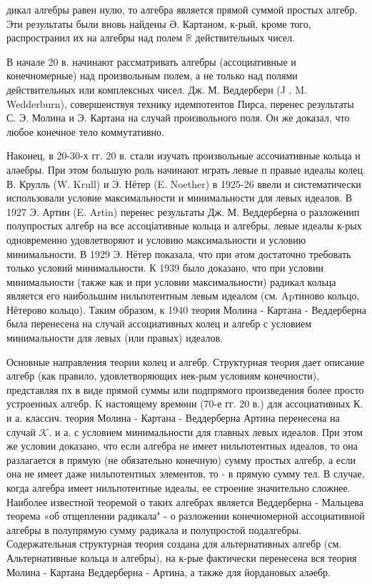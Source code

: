 \documentclass[10pt]{article}
\begin{document}
дикал алгебры равен нулю, то алгебра является прямой суммой простых алгебр. Эти результаты были вновь найдены Ә. Картаном, к-рый, кроме того, распространил их на алгебры над полем $\mathbb{R}$ действительных чисел.



В начале 20 в. начинают рассматривать алгебры (ассоциативные и конечномерные) над произвольным полем, а не только над полями действительных или комплексных чисел. Дж. М. Веддерберн (J . M. Wedderburn), совершенствуя технику идемпотентов Пирса, перенес результаты С. Э. Молина и Э. Картана на случай произвольного поля. Он же доказал, что любое конечное тело коммутативно.



Наконец, в 20-30-х гг. 20 в. стали изучать произвольные ассочиативные кольца $и$ аләебры. При этом большую роль начинают играть левые п правые идеалы колец. В. Крулль (W. Krull) и Э. Нётер (E. Noether) в 1925-26 ввели и систематически использовали условие максимальности и минимальности для левых идеалов. В 1927 Э. Артин (E. Artin) перенес результаты Дж. М. Веддерберна о разложенип полупростых алгебр на все ассоціативные кольца и алгебры, левые идеалы к-рых одновременно удовлетворяют и условию максимальности и условию минимальности. В 1929 Э. Нётер показала, что при әтом достаточно требовать только условий минимальности. К 1939 было доказано, что при условии минимальности (также как и при условии максимальности) радикал кольца является его наибольшим нильпотентным левым идеалом (см. Apтиново кольцо, Нётерово кольцо). Таким образом, к 1940 теория Молина - Картана - Веддерберна была перенесена на случай ассоциативных колец и алгебр с условием минимальности для левых (или правых) идеалов.



Основные направления теории колец и алгебр. Структурная теория дает описание алгебр (как правило, удовлетворяющих нек-рым условиям конечности), представляя пх в виде прямой суммы или подпрямого произведения более просто устроенных алгебр. $\mathrm{K}$ настоящему времөни (70-е гг. 20 в.) для ассоциативных К. и а. классич. теория Молина - Картана - Веддерберна Артина перенесена на случай $\mathcal{K}$. и а. с условием минимальности для главных левых идеалов. При этом же условии доказано, что если алгебра не имеет нильпотентных идеалов, то она разлагается в прямую (не обязательно конечную) сумму простых алгебр, а если она не имеет даже нильпотентных элементов, то - в прямую сумму тел. В случае, когда алгебра имеет нильпотентные идеалы, ее строение значительно сложнее. Наиболее известной теоремой о таких алгебрах является Веддерберна - Мальцева теорема «об отщеплении радикала" - о разложении конечномерной ассоциативной алгебры в полупрямую сумму радикала и полупростой подалгебры. Содержательная структурная теория создана для альтернативных алгебр (см. Альтернативные кольца $и$ алгебры), на к-рые фактически перенесена вся теория Молина - Картана Веддерберна - Артина, а также для йордановых аләебр.
\end{document}
